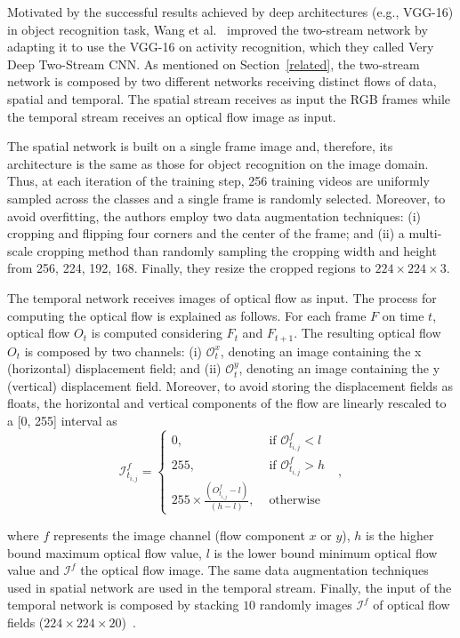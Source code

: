\documentclass[10pt,conference]{IEEEtran}
\begin{document}
Motivated by the successful results achieved by deep architectures (e.g., VGG-16) in object recognition task, Wang et al.~\cite{Wang:2015} improved the two-stream network by adapting it to use the VGG-16 on activity recognition, which they called Very Deep Two-Stream CNN. As mentioned on Section~\ref{related}, the two-stream network is composed by two different networks receiving distinct flows of data, spatial and temporal. The spatial stream receives as input the RGB frames while the temporal stream receives an optical flow image as input.

The spatial network is built on a single frame image and, therefore, its architecture is the same as those for object recognition on the image domain. Thus, at each iteration of the training step, 256 training videos are uniformly sampled across the classes and a single frame is randomly selected. Moreover,  to avoid overfitting, the authors employ two data augmentation techniques: (i) cropping and flipping four corners and the center of the frame; and (ii) a multi-scale cropping method than randomly sampling the cropping width and height from {256, 224, 192, 168}. Finally, they resize the cropped regions to $224\times224\times3$.

The temporal network receives images of optical flow as input. The process for computing the optical flow is explained  as follows. For each frame $F$ on time $t$, optical flow $O_{t}$ is computed considering $F_{t}$ and $F_{t+1}$. The resulting optical flow $O_{t}$ is composed by two channels: (i) ${\mathcal O^{x}_{t}}$, denoting an image containing the x (horizontal) displacement field; and (ii) ${\mathcal O^{y}_{t}}$, denoting an image containing the y (vertical) displacement  field. Moreover, to avoid storing the displacement fields as floats, the horizontal and vertical components of the flow are linearly rescaled to a [0, 255] interval as
\begin{equation}\label{eq:linearflow}
	\mathcal I^{f}_{t_{i,j}} = \left\{
	\begin{array}{rl}
		0, &\mbox{ if $\mathcal O^{f}_{t_{i,j}} < l$} \\
		255, &\mbox{  if $\mathcal O^{f}_{t_{i,j}} > h$ } \\
		255 \times \frac{(O^{f}_{t_{i,j}} - l)}{(h - l)}, &\mbox{ otherwise }
	\end{array} \right.,
\end{equation}

\noindent where $f$ represents the image channel (flow component $x$ or $y$), $h$ is the higher bound maximum optical flow value, $l$ is the lower bound minimum optical flow value and $\mathcal I^{f}$ the optical flow image. The same data augmentation techniques used in spatial network are used in the temporal stream. Finally, the input of the temporal network is composed by stacking $10$ randomly images $\mathcal I^{f}$ of optical flow fields ($224\times224\times20$)~\cite{Simonyan:2014}. 
\end{document}
